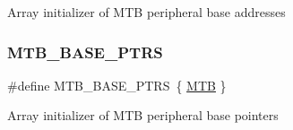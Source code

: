 Array initializer of M\+TB peripheral base addresses \mbox{\label{group___m_t_b___peripheral___access___layer_ga45b3138a9794fd8f2c7613b48646e44f}} 
\subsubsection{\texorpdfstring{MTB\_BASE\_PTRS}{MTB\_BASE\_PTRS}}
{\footnotesize\ttfamily \#define M\+T\+B\+\_\+\+B\+A\+S\+E\+\_\+\+P\+T\+RS~\{ \mbox{\hyperlink{group___m_t_b___peripheral___access___layer_ga09636f7f0071f50666d5747d44c6b94e}{M\+TB}} \}}

Array initializer of M\+TB peripheral base pointers 